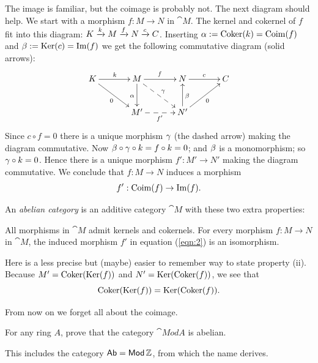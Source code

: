 The image is familiar, but the coimage is probably not. The next diagram 
should help. 
We start with a morphism $f : M \to N$ in $\cat{M}$. 
The kernel and cokernel of $f$ fit into this diagram:
$K \xrightarrow{k} M \xrightarrow{f} N \xrightarrow{c} C$. 
Inserting $\alpha := \operatorname{Coker}(k) = \operatorname{Coim}(f)$ and 
$\beta := \operatorname{Ker}(c) = \operatorname{Im}(f)$
we get the following commutative diagram (solid arrows):
\begin{equation} \label{eqn:1015}
\UseTips  \xymatrix @C=8ex @R=6ex {
K
\ar[r]^{k}
\ar[dr]_{0}
& 
M
\ar[r]^{f}
\ar[d]_{\al}
\ar@{-->}[dr]^{\ga}
&
N
\ar[r]^{c}
&
C
\\
&
M'
\ar@{-->}[r]_{f'}
&
N'
\ar[ur]_{0}
\ar[u]_{\be}
}
\end{equation}
Since $c \circ f = 0$ there is a unique morphism $\gamma$ (the dashed arrow)
making the diagram commutative. Now 
$\beta \circ \gamma \circ k = f \circ k = 0$; and $\beta$ is a monomorphism; so 
$\gamma \circ k = 0$. Hence there is a unique morphism $f' : M' \to N'$ 
making the diagram commutative.
We conclude that $f : M \to N$ induces a morphism 
\begin{equation}  \label{eqn:2}
f' : \operatorname{Coim}(f) \to \operatorname{Im}(f) . 
\end{equation}

\begin{dfn} \label{dfn:1}
An {\em abelian category}%
is an additive category $\cat{M}$ with these two extra properties:
\begin{enumerate}
 All morphisms in $\cat{M}$ admit kernels and cokernels.
 For every morphism $f : M \to N$ in $\cat{M}$, the induced morphism 
$f'$ in equation (\ref{eqn:2}) is an isomorphism.
\end{enumerate}
\end{dfn}

Here is a less precise but (maybe) easier to remember way to state property 
(ii). Because $M' = \operatorname{Coker}(\operatorname{Ker}(f))$ and 
$N' = \operatorname{Ker}(\operatorname{Coker}(f))$, 
we see that 
\begin{equation} \label{eqn:1019}
\operatorname{Coker}(\operatorname{Ker}(f)) = \operatorname{Ker}(\operatorname{Coker}(f))  .
\end{equation}

{}From now on we forget all about the coimage. 

\begin{exer}
For any ring $A$, prove that the category $\cat{Mod} A$ is abelian. 
\end{exer}

This includes the category $\operatorname{\mathsf{Ab}} = \operatorname{\mathsf{Mod}} \mathbb{Z}$, from which the name 
derives. 


